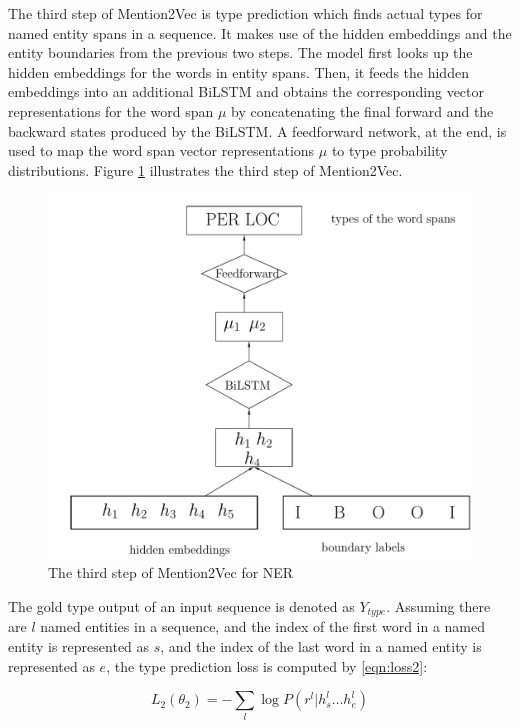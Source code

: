 The third step of Mention2Vec is type prediction which finds actual types for named entity spans in a sequence. It makes use of the hidden embeddings and the entity boundaries from the previous two steps. The model first looks up the hidden embeddings for the words in entity spans. Then, it feeds the hidden embeddings into an additional BiLSTM and obtains the corresponding vector representations for the word span $\mu$ by concatenating the final forward and the backward states produced by the BiLSTM. A feedforward network, at the end, is used to map the word span vector representations $\mu$ to type probability distributions. Figure \ref{fig:mention2vec3} illustrates the third step of Mention2Vec.

\begin{figure}
  \centering
  \includegraphics[scale=0.6]{mention2vec3.pdf}
 \caption{The third step of Mention2Vec for NER}
  \label{fig:mention2vec3}
\end{figure}

The gold type output of an input sequence is denoted as $Y_{type}$. Assuming there are $l$ named entities in a sequence, and the index of the first word in a named entity is represented as $s$, and the index of the last word in a named entity is represented as $e$, the type prediction loss is computed by \ref{eqn:loss2}:

\begin{equation}\label{eqn:loss2}
  L_{2}\left(\theta _{2}\right) =-\sum _{l}\log P\left( r^{l}|h_{s}^{l}{\ldots }h_{e}^{l}\right)
\end{equation}

